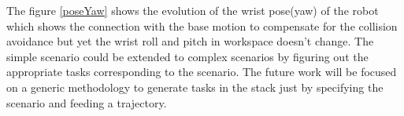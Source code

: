 The figure \ref{poseYaw} shows the evolution of the wrist pose(yaw) of the robot which shows the connection with the base motion to compensate for the collision avoidance but yet the wrist roll and pitch in workspace doesn't change. The simple scenario could be extended to complex scenarios by figuring out the appropriate tasks corresponding to the scenario. The future work will be focused on a generic methodology to generate tasks in the stack just by specifying the scenario and feeding a trajectory.
